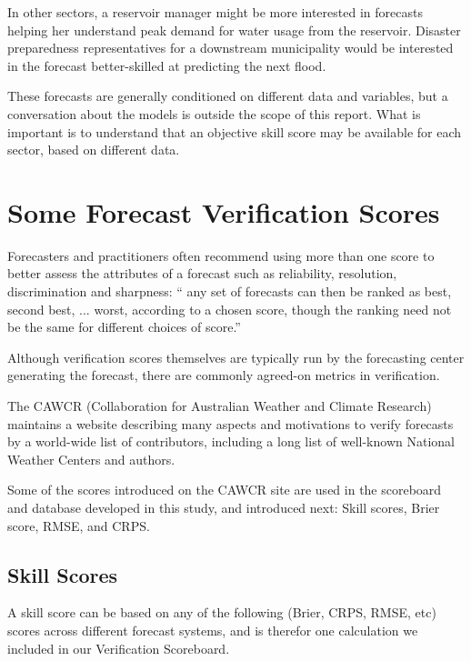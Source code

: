\documentclass[logos,parttoc,morelanguage=french,morelanguage=german]{orsay-memoire}
\begin{document}
In other sectors, a reservoir manager might be more interested in forecasts helping her understand peak demand for water usage from the reservoir. Disaster preparedness representatives for a downstream municipality would be interested in the forecast better-skilled at predicting the next flood.

These forecasts are generally conditioned on different data and variables, but a conversation about the models is outside the scope of this report. What is important is to understand that an objective skill score may be available for each sector, based on different data.

\section{Some Forecast Verification Scores}


Forecasters and practitioners often recommend using more than one score to better assess the attributes of a forecast such as reliability, resolution, discrimination and sharpness: “ any set of forecasts can then be ranked as best, second best, ...  worst, according to a chosen score, though the ranking need not be the same for different choices of score.”

Although verification scores themselves are typically run by the forecasting center generating the forecast, there are commonly agreed-on metrics in verification.

The CAWCR (Collaboration for Australian Weather and Climate Research) maintains a website \autocite{url:cawcr} describing many aspects and motivations to verify forecasts by a world-wide list of contributors, including a long list of well-known National Weather Centers and authors.

Some of the scores introduced on the CAWCR site are used in the scoreboard and database developed in this study, and introduced next: Skill scores, Brier score, RMSE, and CRPS.

\subsection{Skill Scores}

A skill score can be based on any of the following (Brier, CRPS, RMSE, etc) scores across different forecast systems, and is therefor one calculation we included in our Verification Scoreboard. 
\end{document}
